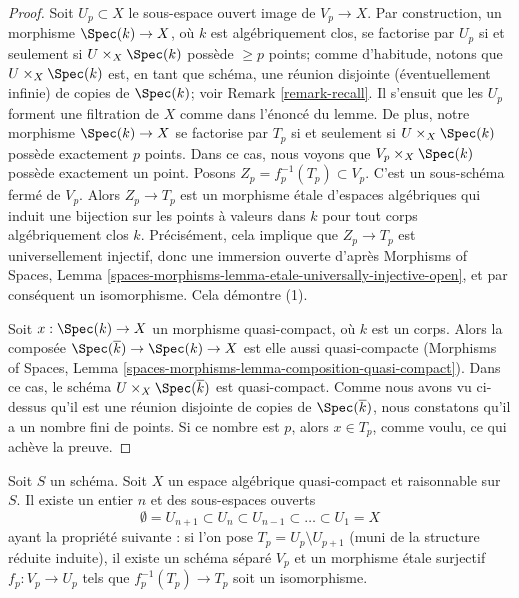 \begin{proof}
\medskip\noindent
Soit $U_p \subset X$ le sous-espace ouvert image de $V_p \to X$.
Par construction, un morphisme $\Spec(k) \to X$, où $k$ est
algébriquement clos, se factorise par $U_p$ si et seulement si
$U \times_X \Spec(k)$ possède $\geq p$ points; comme d'habitude, notons que
$U \times_X \Spec(k)$ est, en tant que schéma, une réunion disjointe
(éventuellement infinie) de copies de $\Spec(k)$; voir
Remark \ref{remark-recall}. Il s'ensuit que les $U_p$ forment une filtration
de $X$ comme dans l'énoncé du lemme. De plus, notre morphisme
$\Spec(k) \to X$ se factorise par $T_p$ si et seulement si
$U \times_X \Spec(k)$ possède exactement $p$ points. Dans ce cas, nous
voyons que $V_p \times_X \Spec(k)$ possède exactement un point.
Posons $Z_p = f_p^{-1}(T_p) \subset V_p$. C'est un sous-schéma fermé de
$V_p$. Alors $Z_p \to T_p$ est un morphisme étale d'espaces algébriques qui
induit une bijection sur les points à valeurs dans $k$ pour tout corps
algébriquement clos $k$. Précisément, cela implique que $Z_p \to T_p$ est
universellement injectif, donc une immersion ouverte d'après
Morphisms of Spaces, Lemma
\ref{spaces-morphisms-lemma-etale-universally-injective-open},
et par conséquent un isomorphisme. Cela démontre (1).

\medskip\noindent
Soit $x : \Spec(k) \to X$ un morphisme quasi-compact, où $k$ est un corps.
Alors la composée $\Spec(\overline{k}) \to \Spec(k) \to X$ est elle aussi
quasi-compacte (Morphisms of Spaces, Lemma
\ref{spaces-morphisms-lemma-composition-quasi-compact}).
Dans ce cas, le schéma $U \times_X \Spec(\overline{k})$ est quasi-compact.
Comme nous avons vu ci-dessus qu'il est une réunion disjointe de copies de
$\Spec(\overline{k})$, nous constatons qu'il a un nombre fini de points.
Si ce nombre est $p$, alors $x \in T_p$, comme voulu, ce qui achève la preuve.
\end{proof}

\begin{lemma}
\label{lemma-filter-reasonable}
Soit $S$ un schéma. Soit $X$ un espace algébrique quasi-compact et raisonnable
sur $S$. Il existe un entier $n$ et des sous-espaces ouverts
$$
\emptyset = U_{n + 1} \subset
U_n \subset U_{n - 1} \subset \ldots \subset U_1 = X
$$
ayant la propriété suivante : si l'on pose $T_p = U_p \setminus U_{p + 1}$
(muni de la structure réduite induite), il existe un schéma séparé $V_p$ et
un morphisme étale surjectif $f_p : V_p \to U_p$ tels que
$f_p^{-1}(T_p) \to T_p$ soit un isomorphisme.
\end{lemma}


